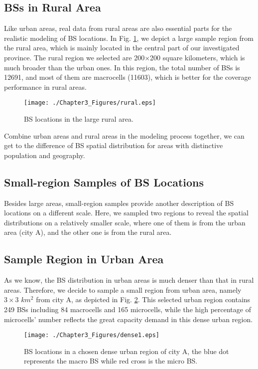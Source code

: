 \subsection*{BSs in Rural Area}
Like urban areas, real data from rural areas are also essential parts for the realistic modeling of BS locations. In Fig. \ref{c3-rural}, we depict a large sample region from the rural area, which is mainly located in the central part of our investigated province. The rural region we selected are 200$\times$200 square kilometers, which is much broader than the urban ones. In this region, the total number of BSs is 12691, and most of them are macrocells (11603), which is better for the coverage performance in rural areas.

\begin{figure}[!htb]
\centering
\texttt{[image: ./Chapter3\_Figures/rural.eps]}
\caption{BS locations in the large rural area.}
\centering
\label{c3-rural}
\end{figure}

Combine urban areas and rural areas in the modeling process together, we can get to the difference of BS spatial distribution for areas with distinctive population and geography.

\subsection{Small-region Samples of BS Locations}
Besides large areas, small-region samples provide another description of BS locations on a different scale. Here, we sampled two regions to reveal the spatial distributions on a relatively smaller scale, where one of them is from the urban area (city A), and the other one is from the rural area.
\subsection*{Sample Region in Urban Area}
As we know, the BS distribution in urban areas is much denser than that in rural areas. Therefore, we decide to sample a small region from urban area, namely $3\times3$ $km^2$ from city A, as depicted in Fig. \ref{c3:dense1}. This selected urban region contains 249 BSs including 84 macrocells and 165 microcells, while the high percentage of microcells' number reflects the great capacity demand in this dense urban region.

\begin{figure}[!htb]
\centering
\texttt{[image: ./Chapter3\_Figures/dense1.eps]}
\caption{BS locations in a chosen dense urban region of city A, the blue dot represents the macro BS while red cross is the micro BS.}
\label{c3:dense1}
\end{figure}


